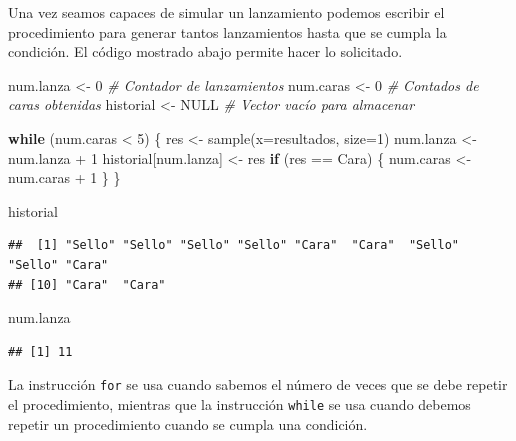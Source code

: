 \documentclass[
]{book}
\makeatletter
\newenvironment{Shaded}{\begin{snugshade}}{\end{snugshade}}
\newcommand{\AttributeTok}[1]{\textcolor[rgb]{0.77,0.63,0.00}{#1}}
\newcommand{\CommentTok}[1]{\textcolor[rgb]{0.56,0.35,0.01}{\textit{#1}}}
\newcommand{\ConstantTok}[1]{\textcolor[rgb]{0.00,0.00,0.00}{#1}}
\newcommand{\ControlFlowTok}[1]{\textcolor[rgb]{0.13,0.29,0.53}{\textbf{#1}}}
\newcommand{\DecValTok}[1]{\textcolor[rgb]{0.00,0.00,0.81}{#1}}
\newcommand{\FunctionTok}[1]{\textcolor[rgb]{0.00,0.00,0.00}{#1}}
\newcommand{\NormalTok}[1]{#1}
\newcommand{\OtherTok}[1]{\textcolor[rgb]{0.56,0.35,0.01}{#1}}
\newcommand{\SpecialCharTok}[1]{\textcolor[rgb]{0.00,0.00,0.00}{#1}}
\newcommand{\StringTok}[1]{\textcolor[rgb]{0.31,0.60,0.02}{#1}}
\newenvironment{kframe}{%
\medskip{}
\setlength{\fboxsep}{.8em}
 \def\at@end@of@kframe{}%
 \ifinner\ifhmode%
  \def\at@end@of@kframe{\end{minipage}}%
  \begin{minipage}{\columnwidth}%
 \fi\fi%
 \def\FrameCommand##1{\hskip\@totalleftmargin \hskip-\fboxsep
 \colorbox{shadecolor}{##1}\hskip-\fboxsep
     \hskip-\linewidth \hskip-\@totalleftmargin \hskip\columnwidth}%
 \MakeFramed {\advance\hsize-\width
   \@totalleftmargin\z@ \linewidth\hsize
   \@setminipage}}%
 {\par\unskip\endMakeFramed%
 \at@end@of@kframe}
\renewenvironment{Shaded}{\begin{kframe}}{\end{kframe}}
\newenvironment{rmdblock}[1]
  {
  \begin{itemize}
  \renewcommand{\labelitemi}{
    \raisebox{-.7\height}[0pt][0pt]{
      {\setkeys{Gin}{width=3em,keepaspectratio}\texttt{[image: images/\#1]}}
    }
  }
  \setlength{\fboxsep}{1em}
  \begin{kframe}
  \item
  }
  {
  \end{kframe}
  \end{itemize}
  }
\newenvironment{rmdnote}
  {\begin{rmdblock}{note}}
  {\end{rmdblock}}
\makeatother
\begin{document}
Una vez seamos capaces de simular un lanzamiento podemos escribir el procedimiento para generar tantos lanzamientos hasta que se cumpla la condición. El código mostrado abajo permite hacer lo solicitado.

\begin{Shaded}
\begin{Highlighting}[]
\NormalTok{num.lanza }\OtherTok{\textless{}{-}} \DecValTok{0}     \CommentTok{\# Contador de lanzamientos}
\NormalTok{num.caras }\OtherTok{\textless{}{-}} \DecValTok{0}     \CommentTok{\# Contados de caras obtenidas}
\NormalTok{historial }\OtherTok{\textless{}{-}} \ConstantTok{NULL}  \CommentTok{\# Vector vacío para almacenar}

\ControlFlowTok{while}\NormalTok{ (num.caras }\SpecialCharTok{\textless{}} \DecValTok{5}\NormalTok{) \{}
\NormalTok{  res }\OtherTok{\textless{}{-}} \FunctionTok{sample}\NormalTok{(}\AttributeTok{x=}\NormalTok{resultados, }\AttributeTok{size=}\DecValTok{1}\NormalTok{)}
\NormalTok{  num.lanza }\OtherTok{\textless{}{-}}\NormalTok{ num.lanza }\SpecialCharTok{+} \DecValTok{1}
\NormalTok{  historial[num.lanza] }\OtherTok{\textless{}{-}}\NormalTok{ res}
  \ControlFlowTok{if}\NormalTok{ (res }\SpecialCharTok{==} \StringTok{\textquotesingle{}Cara\textquotesingle{}}\NormalTok{) \{}
\NormalTok{    num.caras }\OtherTok{\textless{}{-}}\NormalTok{ num.caras }\SpecialCharTok{+} \DecValTok{1}
\NormalTok{  \}}
\NormalTok{\}}

\NormalTok{historial}
\end{Highlighting}
\end{Shaded}

\begin{verbatim}
##  [1] "Sello" "Sello" "Sello" "Sello" "Cara"  "Cara"  "Sello" "Sello" "Cara" 
## [10] "Cara"  "Cara"
\end{verbatim}

\begin{Shaded}
\begin{Highlighting}[]
\NormalTok{num.lanza}
\end{Highlighting}
\end{Shaded}

\begin{verbatim}
## [1] 11
\end{verbatim}

\begin{rmdnote}
La instrucción \texttt{for} se usa cuando sabemos el número de veces que se debe repetir el procedimiento, mientras que la instrucción \texttt{while} se usa cuando debemos repetir un procedimiento cuando se cumpla una condición.
\end{rmdnote}
\end{document}
